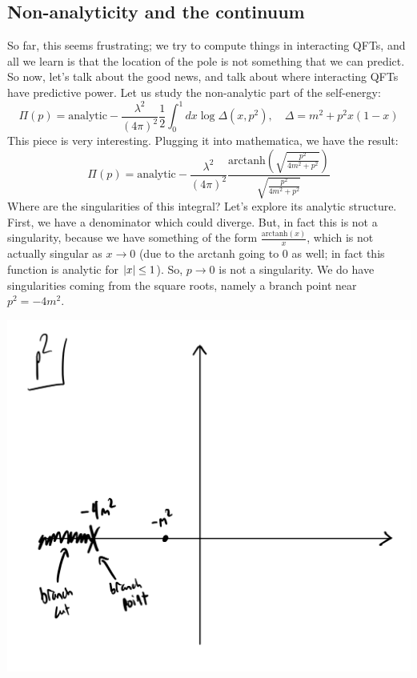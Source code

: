 \subsection{Non-analyticity and the continuum}
So far, this seems frustrating; we try to compute things in interacting QFTs, and all we learn is that the location of the pole is not something that we can predict. So now, let's talk about the good news, and talk about where interacting QFTs have predictive power. Let us study the non-analytic part of the self-energy:
\begin{equation}
    \Pi(p) = \text{analytic} - \frac{\lambda^2}{(4\pi)^2}\frac{1}{2}\int_0^1 dx \log \Delta(x, p^2), \quad \Delta = m^2 + p^2x(1-x)
\end{equation}
This piece is very interesting. Plugging it into mathematica, we have the result:
\begin{equation}
    \Pi(p) = \text{analytic} - \frac{\lambda^2}{(4\pi)^2}\frac{\text{arctanh}(\sqrt{\frac{p^2}{4m^2 + p^2}})}{\sqrt{\frac{p^2}{4m^2 + p^2}}}
\end{equation}
Where are the singularities of this integral? Let's explore its analytic structure. First, we have a denominator which could diverge. But, in fact this is not a singularity, because we have something of the form $\frac{\text{arctanh}(x)}{x}$, which is not actually singular as $x \to 0$ (due to the arctanh going to $0$ as well; in fact this function is analytic for $\lvert x \rvert \leq 1$). So, $p \to 0$ is not a singularity. We do have singularities coming from the square roots, namely a branch point near $p^2= -4m^2$.

\begin{center}
    \includegraphics[scale=0.4]{Lectures/Figures/lec13-nonanalytic.png}
\end{center}


